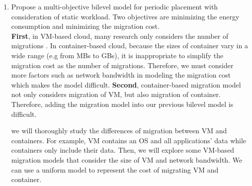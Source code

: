 \begin{enumerate}
	\item Propose a multi-objective bilevel model for periodic placement with consideration of static workload.  Two objectives are minimizing the energy consumption and minimizing the migration cost. \\

	\textbf{First}, in VM-based cloud, many research only considers the number of migrations \cite{Murtazaev:2014eo}. In container-based cloud, because the sizes of container vary in a wide range (e.g from MBs to GBs), it is inappropriate to simplify the migration cost as the number of migrations. Therefore, we must consider more factors such as network bandwidth in modeling the migration cost which makes the model difficult. \textbf{Second}, container-based migration model not only considers migration of VM, but also migration of container. Therefore, adding the migration model into our previous bilevel model is difficult. 

	 we will thoroughly study the differences of migration between VM and containers. For example, VM contains an OS and all applications' data while containers only include their data. Then, we will explore some VM-based migration models that consider the size of VM and network bandwidth. We can use a uniform model to represent the  cost of migrating VM and container.




\end{enumerate}
